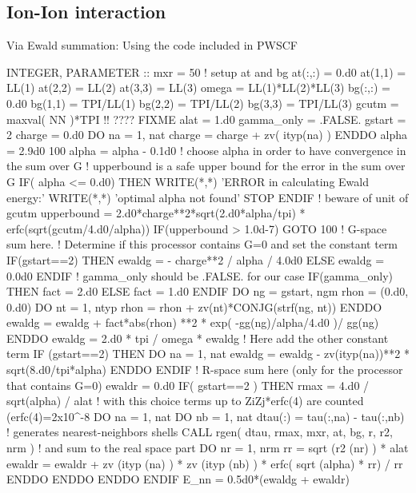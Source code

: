 \subsection{Ion-Ion interaction}

Via Ewald summation:
Using the code included in PWSCF
\begin{fortrancode}
INTEGER, PARAMETER :: mxr = 50
! setup at and bg
at(:,:) = 0.d0
at(1,1) = LL(1)
at(2,2) = LL(2)
at(3,3) = LL(3)
omega = LL(1)*LL(2)*LL(3)
bg(:,:) = 0.d0
bg(1,1) = TPI/LL(1)
bg(2,2) = TPI/LL(2)
bg(3,3) = TPI/LL(3)
gcutm = maxval( NN )*TPI  !! ???? FIXME
alat = 1.d0
gamma_only = .FALSE.
gstart = 2
charge = 0.d0
DO na = 1, nat
   charge = charge + zv( ityp(na) )
ENDDO
alpha = 2.9d0
100 alpha = alpha - 0.1d0
! choose alpha in order to have convergence in the sum over G
! upperbound is a safe upper bound for the error in the sum over G
IF( alpha <= 0.d0) THEN 
  WRITE(*,*) 'ERROR in calculating Ewald energy:'
  WRITE(*,*) 'optimal alpha not found'
  STOP 
ENDIF 
! beware of unit of gcutm
upperbound = 2.d0*charge**2*sqrt(2.d0*alpha/tpi) * erfc(sqrt(gcutm/4.d0/alpha))  
IF(upperbound > 1.0d-7) GOTO 100
! G-space sum here.
! Determine if this processor contains G=0 and set the constant term
IF(gstart==2) THEN 
  ewaldg = - charge**2 / alpha / 4.0d0
ELSE 
  ewaldg = 0.0d0
ENDIF 
! gamma_only should be .FALSE. for our case
IF(gamma_only) THEN 
  fact = 2.d0
ELSE
  fact = 1.d0
ENDIF 
DO ng = gstart, ngm
  rhon = (0.d0, 0.d0)
  DO nt = 1, ntyp
    rhon = rhon + zv(nt)*CONJG(strf(ng, nt))
  ENDDO
  ewaldg = ewaldg + fact*abs(rhon) **2 * exp( -gg(ng)/alpha/4.d0 )/ gg(ng)
ENDDO
ewaldg = 2.d0 * tpi / omega * ewaldg
!  Here add the other constant term
IF (gstart==2) THEN 
  DO na = 1, nat
    ewaldg = ewaldg - zv(ityp(na))**2 * sqrt(8.d0/tpi*alpha)
  ENDDO
ENDIF 
! R-space sum here (only for the processor that contains G=0)
ewaldr = 0.d0
IF( gstart==2 ) THEN 
  rmax = 4.d0 / sqrt(alpha) / alat
  ! with this choice terms up to ZiZj*erfc(4) are counted (erfc(4)=2x10^-8
  DO na = 1, nat
    DO nb = 1, nat
      dtau(:) = tau(:,na) - tau(:,nb)
      ! generates nearest-neighbors shells
      CALL rgen( dtau, rmax, mxr, at, bg, r, r2, nrm )
      ! and sum to the real space part
      DO nr = 1, nrm
        rr = sqrt (r2 (nr) ) * alat
        ewaldr = ewaldr + zv (ityp (na) ) * zv (ityp (nb) ) * erfc( sqrt (alpha) * rr) / rr
      ENDDO 
    ENDDO 
  ENDDO 
ENDIF 
E_nn = 0.5d0*(ewaldg + ewaldr)
\end{fortrancode}

